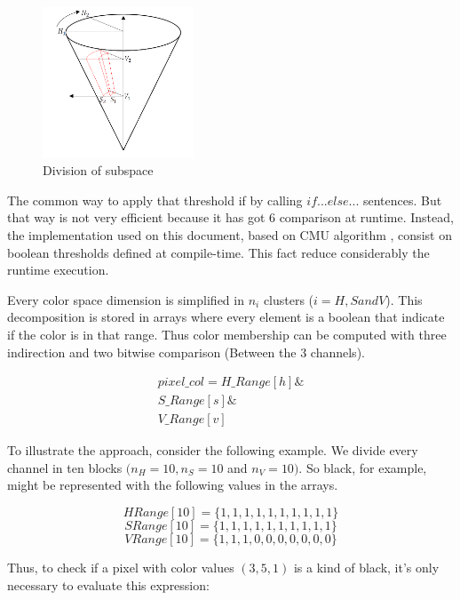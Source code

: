 \begin{figure}
	\includegraphics[width=0.4\textwidth,natwidth=659,natheight=659]{../Images/c2/DividingSubSpace.png}
	\caption{Division of subspace}
	\label{fig:DividingSubSpace}
\end{figure}

The common way to apply that threshold if by calling $if...else...$ sentences. But that way is not very efficient because it has got 6 comparison at runtime. Instead, the implementation used on this document, based on CMU algorithm \cite{JamesBruce_CMU_SEG}, consist on boolean thresholds defined at compile-time. This fact reduce considerably the runtime execution. 

Every color space dimension is simplified in $n_i$ clusters ($i = H, S and V$). This decomposition is stored in arrays where every element is a boolean that indicate if the color is in that range. Thus color membership can be computed with three indirection and two bitwise comparison (Between the 3 channels). 

\begin{equation}
\begin{split}
pixel\_col = H\_Range[h] \& \\
S\_Range[s] \& \\
V\_Range[v] 
\end{split}
\end{equation}
	

To illustrate the approach, consider the following example. We divide every channel in ten blocks $(n_H = 10, n_S = 10$ and $n_V = 10)$. So black, for example, might be  represented with the following values in the arrays.

{\centering
\[HRange[10] = \{1, 1, 1, 1, 1, 1, 1, 1, 1, 1\}\]
\[SRange[10] = \{1, 1, 1, 1, 1, 1, 1, 1, 1, 1\}\]
\[VRange[10] = \{1, 1, 1, 0, 0, 0, 0, 0, 0, 0\}\]
} 

Thus, to check if a pixel with color values $(3, 5, 1)$ is a kind of black, it's only necessary to evaluate this expression: 

